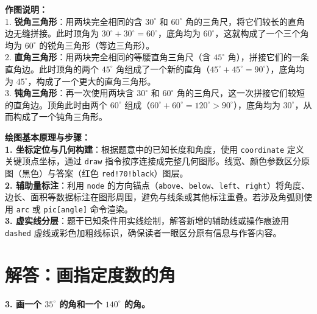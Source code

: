 \vspace{0.6cm}
{\small\color{gray}
\textbf{作图说明：}\\
1. \textbf{锐角三角形}：用两块完全相同的含 $30^\circ$ 和 $60^\circ$ 角的三角尺，将它们较长的直角边无缝拼接。此时顶角为 $30^\circ + 30^\circ = 60^\circ$，底角均为 $60^\circ$，这就构成了一个三个角均为 $60^\circ$ 的锐角三角形（等边三角形）。\\
2. \textbf{直角三角形}：用两块完全相同的等腰直角三角尺（含 $45^\circ$ 角），拼接它们的一条直角边。此时顶角的两个 $45^\circ$ 角组成了一个新的直角（$45^\circ + 45^\circ = 90^\circ$），底角均为 $45^\circ$，构成了一个更大的直角三角形。\\
3. \textbf{钝角三角形}：再一次使用两块含 $30^\circ$ 和 $60^\circ$ 角的三角尺，这一次拼接它们较短的直角边。顶角此时由两个 $60^\circ$ 组成（$60^\circ + 60^\circ = 120^\circ>90^\circ$），底角均为 $30^\circ$，从而构成了一个钝角三角形。
}

\vspace{0.8cm}


\vspace{0.6cm}

{\small\color{blue!70!black}
\textbf{绘图基本原理与步骤：}\\
\textbf{1. 坐标定位与几何构建}：根据题意中的已知长度和角度，使用 \texttt{coordinate} 定义关键顶点坐标，通过 \texttt{draw} 指令按序连接成完整几何图形。线宽、颜色参数区分原图（黑色）与答案（红色 \texttt{red!70!black}）图层。\\
\textbf{2. 辅助量标注}：利用 \texttt{node} 的方向锚点（\texttt{above}、\texttt{below}、\texttt{left}、\texttt{right}）将角度、边长、面积等数据标注在图形周围，避免与线条或其他标注重叠。若涉及角弧则使用 \texttt{arc} 或 \texttt{pic[angle]} 命令渲染。\\
\textbf{3. 虚实线分层}：题干已知条件用实线绘制，解答新增的辅助线或操作痕迹用 \texttt{dashed} 虚线或彩色加粗线标识，确保读者一眼区分原有信息与作答内容。
}

\newpage


\section{解答：画指定度数的角}

\vspace{0.4cm}

\noindent\textbf{3. 画一个 $35^\circ$ 的角和一个 $140^\circ$ 的角。}

\vspace{1.2cm}

